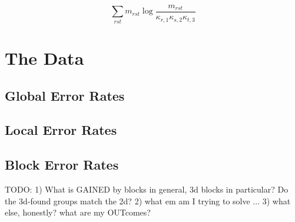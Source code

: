 \documentclass[11pt]{scrartcl}
\begin{document}
\[
\sum_{rst} m_{rst} \log \frac{m_{rst}}{\kappa_{r,1} \kappa_{s,2} \kappa_{t,3}}
\]

\section{The Data}
	
\subsection{Global Error Rates}
	
\subsection{Local Error Rates}

\subsection{Block Error Rates}

TODO:
1) What is GAINED by blocks in general, 3d blocks in particular?
    Do the 3d-found groups match the 2d?
2) what em am I trying to solve ... 
3) what else, honestly? what are my OUTcomes? 
\end{document}
